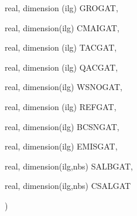 {\begin{DoxyParamCaption}
\item[{real, dimension (ilg)}]{G\+R\+O\+G\+A\+T, }
\item[{real, dimension(ilg)}]{C\+M\+A\+I\+G\+A\+T, }
\item[{real, dimension (ilg)}]{T\+A\+C\+G\+A\+T, }
\item[{real, dimension (ilg)}]{Q\+A\+C\+G\+A\+T, }
\item[{real, dimension(ilg)}]{W\+S\+N\+O\+G\+A\+T, }
\item[{real, dimension (ilg)}]{R\+E\+F\+G\+A\+T, }
\item[{real, dimension(ilg)}]{B\+C\+S\+N\+G\+A\+T, }
\item[{real, dimension(ilg)}]{E\+M\+I\+S\+G\+A\+T, }
\item[{real, dimension(ilg,nbs)}]{S\+A\+L\+B\+G\+A\+T, }
\item[{real, dimension(ilg,nbs)}]{C\+S\+A\+L\+G\+A\+T}
\end{DoxyParamCaption}
)}\label{CLASSS_8f_a3814fc276d21467a86f856186dd5d938}

